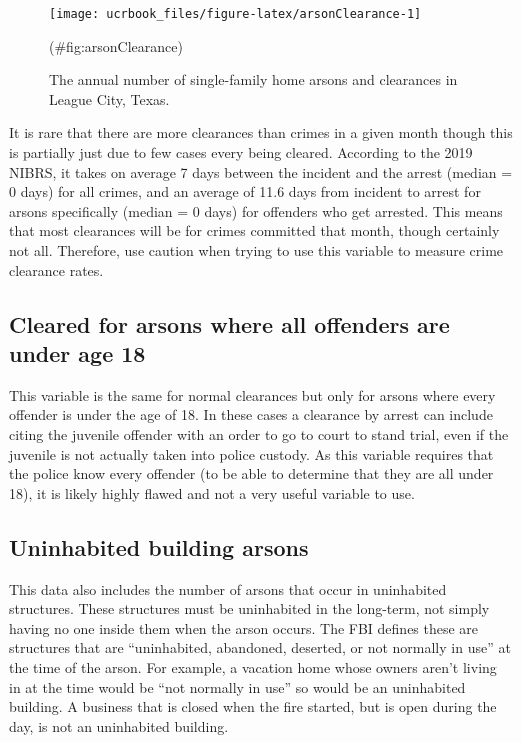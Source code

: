 \documentclass[
  12pt,
  openany]{book}
\begin{document}
\begin{figure}

{\centering \texttt{[image: ucrbook\_files/figure-latex/arsonClearance-1]} 

}

\caption{The annual number of single-family home arsons and clearances in League City, Texas.}(\#fig:arsonClearance)
\end{figure}

It is rare that there are more clearances than crimes in a given month though this is partially just due to few cases every being cleared. According to the 2019 NIBRS, it takes on average 7 days between the incident and the arrest (median = 0 days) for all crimes, and an average of 11.6 days from incident to arrest for arsons specifically (median = 0 days) for offenders who get arrested. This means that most clearances will be for crimes committed that month, though certainly not all. Therefore, use caution when trying to use this variable to measure crime clearance rates.

\hypertarget{cleared-for-arsons-where-all-offenders-are-under-age-18}{%
\subsection{Cleared for arsons where all offenders are under age 18}\label{cleared-for-arsons-where-all-offenders-are-under-age-18}}

This variable is the same for normal clearances but only for arsons where every offender is under the age of 18. In these cases a clearance by arrest can include citing the juvenile offender with an order to go to court to stand trial, even if the juvenile is not actually taken into police custody. As this variable requires that the police know every offender (to be able to determine that they are all under 18), it is likely highly flawed and not a very useful variable to use.

\hypertarget{uninhabited-building-arsons}{%
\subsection{Uninhabited building arsons}\label{uninhabited-building-arsons}}

This data also includes the number of arsons that occur in uninhabited structures. These structures must be uninhabited in the long-term, not simply having no one inside them when the arson occurs. The FBI defines these are structures that are ``uninhabited, abandoned, deserted, or not normally in use'' at the time of the arson. For example, a vacation home whose owners aren't living in at the time would be ``not normally in use'' so would be an uninhabited building. A business that is closed when the fire started, but is open during the day, is not an uninhabited building.
\end{document}
